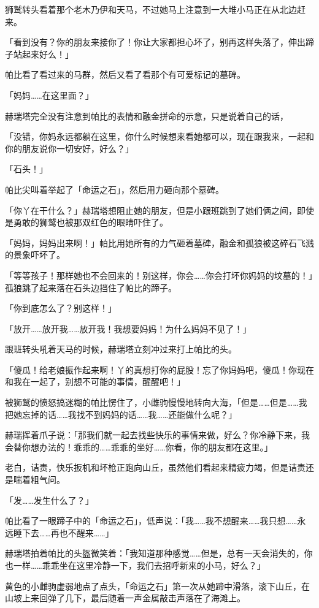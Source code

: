 狮鹫转头看着那个老木乃伊和天马，不过她马上注意到一大堆小马正在从北边赶来。

「看到没有？你的朋友来接你了！你让大家都担心坏了，别再这样失落了，伸出蹄子站起来好么！」

帕比看了看过来的马群，然后又看了看那个有可爱标记的墓碑。

「妈妈……在这里面？」

赫瑞塔完全没有注意到帕比的表情和融金拼命的示意，只是说着自己的话，

「没错，你妈永远都躺在这里，你什么时候想来看她都可以，现在跟我来，一起和你的朋友说你一切安好，好么？」

「石头！」

帕比尖叫着举起了「命运之石」，然后用力砸向那个墓碑。

「你丫在干什么？」赫瑞塔想阻止她的朋友，但是小跟班跳到了她们俩之间，即使是勇敢的狮鹫也被那双红色的眼睛吓住了。

「妈妈，妈妈出来啊！」帕比用她所有的力气砸着墓碑，融金和孤狼被这碎石飞溅的景象吓坏了。

「等等孩子！那样她也不会回来的！别这样，你会……你会打坏你妈妈的坟墓的！」孤狼跳了起来落在石头边挡住了帕比的蹄子。

「你到底怎么了？别这样！」

「放开……放开我……放开我！我想要妈妈！为什么妈妈不见了！」

跟班转头吼着天马的时候，赫瑞塔立刻冲过来打上帕比的头。

「傻瓜！给老娘振作起来啊！丫的真想打你的屁股！忘了你妈妈吧，傻瓜！你现在和我在一起了，别想不可能的事情，醒醒吧！」

被狮鹫的愤怒搞迷糊的帕比愣住了，小雌驹慢慢地转向大海，「但是……但是……我把她忘掉的话……我找不到妈妈的话……我……还能做什么呢？」

赫瑞挥着爪子说：「那我们就一起去找些快乐的事情来做，好么？你冷静下来，我会替你想办法的！乖乖的……乖乖的坐好……你看，你的朋友都在这里。」

老白，诘责，快乐扳机和坏枪正跑向山丘，虽然他们看起来精疲力竭，但是诘责还是喘着粗气问。

「发……发生什么了？」

帕比看了一眼蹄子中的「命运之石」，低声说：「我……我不想醒来……我只想……永远睡下去……再也不醒来……」

赫瑞塔拍着帕比的头盔微笑着：「我知道那种感觉……但是，总有一天会消失的，你也一样……乖乖坐在这里冷静一下，我们去招呼新来的小马，好么？」

黄色的小雌驹虚弱地点了点头，「命运之石」第一次从她蹄中滑落，滚下山丘，在山坡上来回弹了几下，最后随着一声金属敲击声落在了海滩上。


